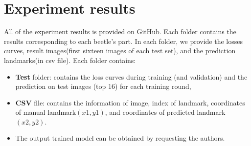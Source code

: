\documentclass[12pt,a4paper]{article}
\begin{document}
\section{Experiment results}
\label{apb}
All of the experiment results is provided on GitHub. Each folder contains the results corresponding to each beetle's part. In each folder, we provide the losses curves, result images(first sixteen images of each test set), and the prediction landmarks(in csv file). Each folder contains:
\begin{itemize}
	\item \textbf{Test} folder: contains the loss curves during training (and validation) and the prediction on test images (top 16) for each training round,
	\item \textbf{CSV} file: contains the information of image, index of landmark, coordinates of manual landmark$(x1,y1)$, and coordinates of predicted landmark$(x2,y2)$.
	\item The output trained model can be obtained by requesting the authors.
\end{itemize}
\end{document}
